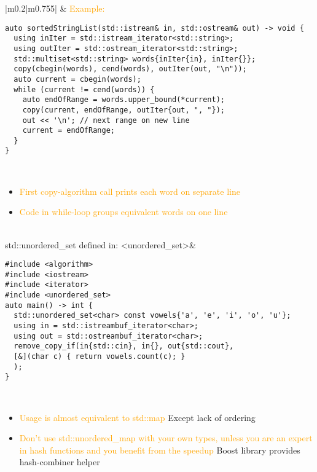 \documentclass[main.tex,fontsize=8pt,paper=a4,paper=portrait,DIV=calc]{scrartcl}
\begin{document}
\begin{table}[ht!]
\begin{tabular}{|m{0.2\linewidth}|m{0.755\linewidth}|}
\hline
&
\textcolor{orange}{Example:}\newline
\begin{lstlisting}
auto sortedStringList(std::istream& in, std::ostream& out) -> void {
  using inIter = std::istream_iterator<std::string>;
  using outIter = std::ostream_iterator<std::string>;
  std::multiset<std::string> words{inIter{in}, inIter{}};
  copy(cbegin(words), cend(words), outIter(out, "\n"));
  auto current = cbegin(words);
  while (current != cend(words)) {
    auto endOfRange = words.upper_bound(*current);
    copy(current, endOfRange, outIter{out, ", "});
    out << '\n'; // next range on new line
    current = endOfRange;
  }
}
\end{lstlisting} 
\, \newline
\begin{itemize}
\item \textcolor{orange}{First copy-algorithm call prints each word on separate line}
\item \textcolor{orange}{Code in while-loop groups equivalent words on one line}
\vspace{-2mm}
\end{itemize} \\
\hline
std::unordered\_set \newline 
defined in: <unordered\_set>& 
\begin{lstlisting}
#include <algorithm>
#include <iostream>
#include <iterator>
#include <unordered_set>
auto main() -> int {
  std::unordered_set<char> const vowels{'a', 'e', 'i', 'o', 'u'};
  using in = std::istreambuf_iterator<char>;
  using out = std::ostreambuf_iterator<char>;
  remove_copy_if(in{std::cin}, in{}, out{std::cout},
  [&](char c) { return vowels.count(c); }
  );
}
\end{lstlisting}
\, \newline
\begin{itemize}
\item \textcolor{orange}{Usage is almost equivalent to std::map}\newline
  Except lack of ordering
\item \textcolor{orange}{Don't use std::unordered\_map with your own types, unless you are an expert in hash functions and you benefit from the speedup}\newline
  Boost library provides hash-combiner helper
\vspace{-2mm}

\end{itemize}
\end{tabular}
\end{table}
\end{document}
